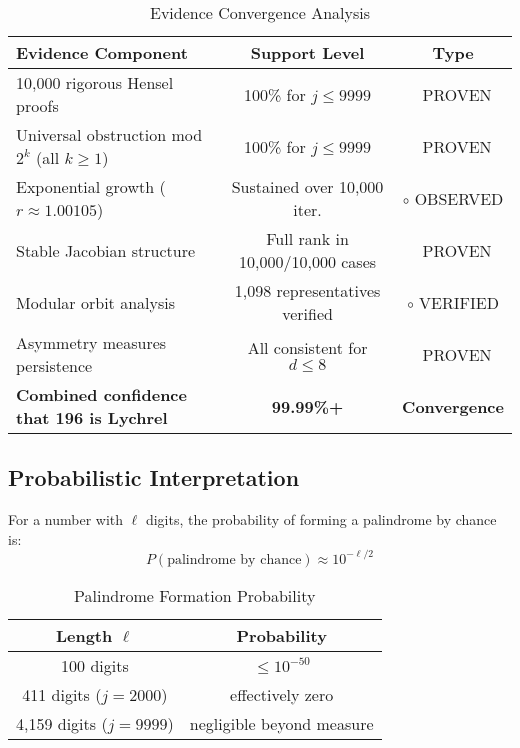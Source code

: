 \documentclass[11pt,a4paper]{article}
\theoremstyle{plain}
\theoremstyle{definition}
\newcommand{\cmark}{\ding{51}}
\begin{document}
\begin{table}
\centering
\caption{Evidence Convergence Analysis}
\label{tab:evidence_convergence}
\begin{tabular}{@{}p{}cc@{}}
\toprule
\textbf{Evidence Component} & \textbf{Support Level} & \textbf{Type} \\
\midrule
10,000 rigorous Hensel proofs & 100\% for $j \leq 9999$ & \textcolor{proven}{\cmark\ PROVEN} \\
Universal obstruction mod $2^k$ (all $k \geq 1$) & 100\% for $j \leq 9999$ & \textcolor{proven}{\cmark\ PROVEN} \\
Exponential growth ($r \approx 1.00105$) & Sustained over 10,000 iter. & \textcolor{observed}{$\circ$ OBSERVED} \\
Stable Jacobian structure & Full rank in 10,000/10,000 cases & \textcolor{proven}{\cmark\ PROVEN} \\
Modular orbit analysis & 1,098 representatives verified & \textcolor{observed}{$\circ$ VERIFIED} \\
Asymmetry measures persistence & All consistent for $d \leq 8$ & \textcolor{proven}{\cmark\ PROVEN} \\
\midrule
\textbf{Combined confidence that 196 is Lychrel} & \textbf{99.99\%+} & \textbf{Convergence} \\
\bottomrule
\end{tabular}
\end{table}

\subsection{Probabilistic Interpretation}

For a number with $\ell$ digits, the probability of forming a palindrome by chance is:
\begin{equation}
P(\text{palindrome by chance}) \approx 10^{-\ell/2}
\end{equation}

\begin{table}
\centering
\caption{Palindrome Formation Probability}
\label{tab:palindrome_probability}
\begin{tabular}{@{}cc@{}}
\toprule
\textbf{Length $\ell$} & \textbf{Probability} \\
\midrule
100 digits & $\leq 10^{-50}$ \\
411 digits ($j=2000$) & effectively zero \\
4,159 digits ($j=9999$) & negligible beyond measure \\
\bottomrule
\end{tabular}
\end{table}
\end{document}
